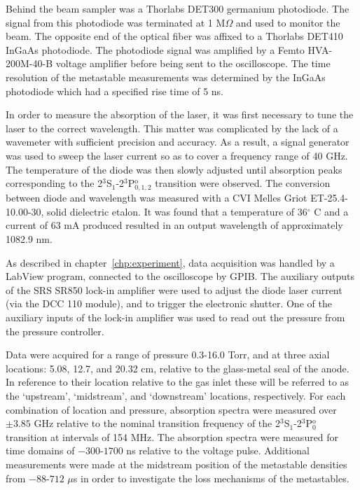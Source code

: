Behind the beam sampler was a Thorlabs DET300 germanium photodiode. The signal
from this photodiode was terminated at 1 M$\Omega$ and used to monitor the beam.
The opposite end of the optical fiber was affixed to a Thorlabs DET410 InGaAs
photodiode. The photodiode signal was amplified by a Femto HVA-200M-40-B voltage
amplifier before being sent to the oscilloscope. The time resolution of the
metastable measurements was determined by the InGaAs photodiode which had a
specified rise time of 5 ns.

In order to measure the absorption of the laser, it was first necessary to tune
the laser to the correct wavelength. This matter was complicated by the lack of
a wavemeter with sufficient precision and accuracy. As a result, a signal
generator was used to sweep the laser current so as to cover a frequency range
of 40 GHz. The temperature of the diode was then slowly adjusted until
absorption peaks corresponding to the 2$^3$S$_1$-2$^3$P$_{0,1,2}^\mathrm{o}$
transition were observed. The conversion between diode and wavelength was
measured with a CVI Melles Griot ET-25.4-10.00-30, solid dielectric etalon. It
was found that a temperature of 36$^\circ$ C and a current of 63 mA produced
resulted in an output wavelength of approximately 1082.9 nm.

As described in chapter~\ref{chp:experiment}, data acquisition was handled by a
LabView program, connected to the oscilloscope by GPIB\@. The auxiliary outputs of
the SRS SR850 lock-in amplifier were used to adjust the diode laser current (via
the DCC 110 module), and to trigger the electronic shutter. One of the auxiliary
inputs of the lock-in amplifier was used to read out the pressure from the
pressure controller.

Data were acquired for a range of pressure 0.3-16.0 Torr, and at three axial
locations: 5.08, 12.7, and 20.32 cm, relative to the glass-metal seal of the
anode. In reference to their location relative to the gas inlet these will be
referred to as the `upstream', `midstream', and `downstream' locations,
respectively. For each combination of location and pressure, absorption spectra
were measured over $\pm3.85$ GHz relative to the nominal transition frequency of
the 2$^3$S$_1$-2$^3$P$_0^\mathrm{o}$ transition at intervals of 154 MHz. The
absorption spectra were measured for time domains of $-300$-$1700$ ns relative
to the voltage pulse. Additional measurements were made at the midstream
position of the metastable densities from $-88$-$712$ $\mu$s in order to
investigate the loss mechanisms of the metastables.

